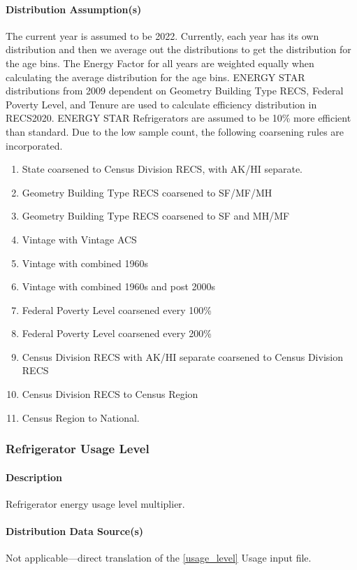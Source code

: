 \paragraph{Distribution Assumption(s)}
The current year is assumed to be 2022. Currently, each year has its own distribution and then we average out the distributions to get the distribution for the age bins. The Energy Factor for all years are weighted equally when calculating the average distribution for the age bins. ENERGY STAR distributions from 2009 dependent on Geometry Building Type RECS, Federal Poverty Level, and Tenure are used to calculate efficiency distribution in RECS2020. ENERGY STAR Refrigerators are assumed to be 10\% more efficient than standard. Due to the low sample count, the following coarsening rules are incorporated.
\begin{enumerate}
    \item  State coarsened to Census Division RECS, with AK/HI separate.
    \item Geometry Building Type RECS coarsened to SF/MF/MH 
    \item Geometry Building Type RECS coarsened to SF and MH/MF 
    \item  Vintage with Vintage ACS 
    \item Vintage with combined 1960s 
    \item Vintage with combined 1960s and post 2000s 
    \item  Federal Poverty Level coarsened every 100\% 
    \item  Federal Poverty Level coarsened every 200\% 
    \item Census Division RECS with AK/HI separate coarsened to Census Division RECS 
    \item  Census Division RECS to Census Region 
    \item Census Region to National. 
\end{enumerate}

\subsubsection{Refrigerator Usage Level}
\paragraph{Description}
Refrigerator energy usage level multiplier.
\paragraph{Distribution Data Source(s)}
Not applicable---direct translation of the \ref{usage_level} Usage input file.

